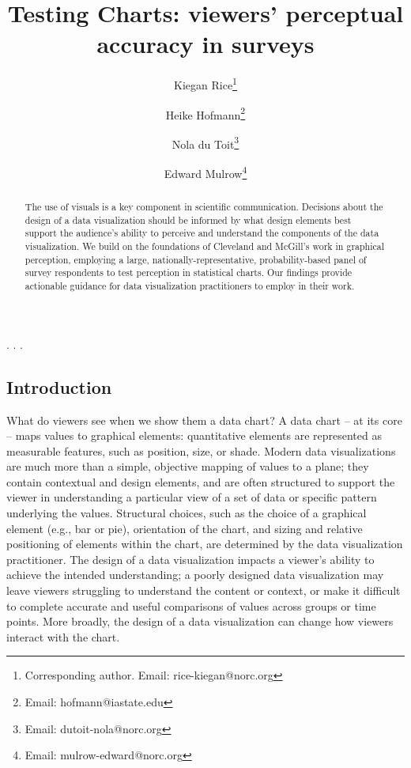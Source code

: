\documentclass[
]{jds}
\author[1]{Kiegan Rice\thanks{Corresponding author. Email: rice-kiegan@norc.org}}
\author[2]{Heike Hofmann\footnote{Email: hofmann@iastate.edu}}
\author[1]{Nola du Toit\footnote{Email: dutoit-nola@norc.org}}
\author[1]{Edward Mulrow\footnote{Email: mulrow-edward@norc.org}}
\affil[1]{NORC at the University of Chicago}
\affil[2]{Department of Statistics, Iowa State University}
\title{Testing Charts: viewers' perceptual accuracy in surveys}
\author{}
\date{}
\begin{document}
\maketitle
\begin{abstract}
The use of visuals is a key component in scientific communication.
Decisions about the design of a data visualization should be informed by
what design elements best support the audience's ability to perceive and
understand the components of the data visualization. We build on the
foundations of Cleveland and McGill's work in graphical perception,
employing a large, nationally-representative, probability-based panel of
survey respondents to test perception in statistical charts. Our
findings provide actionable guidance for data visualization
practitioners to employ in their work.
\end{abstract}
\ifdefined\Shaded\renewenvironment{Shaded}{\begin{tcolorbox}[boxrule=0pt, enhanced, borderline west={3pt}{0pt}{shadecolor}, sharp corners, breakable, interior hidden, frame hidden]}{\end{tcolorbox}}\fi

  \newcommand{\hh}[1]{{\textcolor{orange}{#1}}} 
  \newcommand{\kr}[1]{{\textcolor{teal}{#1}}}.  
  \newcommand{\ejm}[1]{{\textcolor{ForestGreen}{#1}}}.  
  \newcommand{\ndt}[1]{{\textcolor{purple}{#1}}}.  


  \newcommand{\blandscape}{\begin{landscape}} 
  \newcommand{\elandscape}{\end{landscape}}

  \setlength{\parindent}{0pt}
  \singlespacing

\hypertarget{introduction}{%
\subsection{Introduction}\label{introduction}}

What do viewers see when we show them a data chart? A data chart -- at
its core -- maps values to graphical elements: quantitative elements are
represented as measurable features, such as position, size, or shade.
Modern data visualizations are much more than a simple, objective
mapping of values to a plane; they contain contextual and design
elements, and are often structured to support the viewer in
understanding a particular view of a set of data or specific pattern
underlying the values. Structural choices, such as the choice of a
graphical element (e.g., bar or pie), orientation of the chart, and
sizing and relative positioning of elements within the chart, are
determined by the data visualization practitioner. The design of a data
visualization impacts a viewer's ability to achieve the intended
understanding; a poorly designed data visualization may leave viewers
struggling to understand the content or context, or make it difficult to
complete accurate and useful comparisons of values across groups or time
points. More broadly, the design of a data visualization can change how
viewers interact with the chart.
\end{document}

